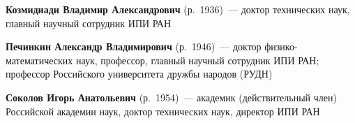 \begin{multicols}{2}
\noindent
\textbf{Козмидиади Владимир Александрович} (р.\ 1936)~--- 
доктор технических наук, главный научный сотрудник ИПИ РАН


\medskip%







\vspace*{6pt}

\noindent
\textbf{Печинкин Александр Владимирович} (р.\ 1946)~--- доктор физико-математических наук,
профессор, главный научный сотрудник ИПИ РАН; профессор Российского университета
дружбы народов (РУДН)





\vspace*{6pt}

\noindent %
\textbf{Соколов Игорь Анатольевич} (р.\ 1954)~---
академик (действительный член) Российской академии наук,
доктор технических наук, директор ИПИ РАН



\end{multicols}
